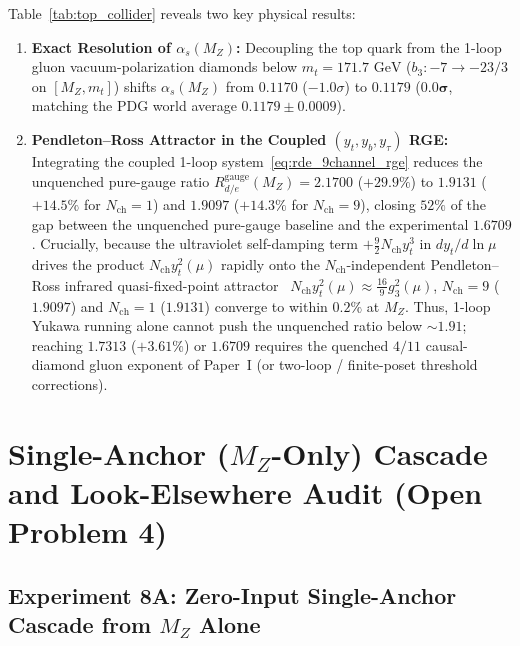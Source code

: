\documentclass[11pt,a4paper]{article}
\theoremstyle{definition}
\theoremstyle{remark}
\begin{document}
\newpage
Table~\ref{tab:top_collider} reveals two key physical results:
\begin{enumerate}
    \item \textbf{Exact Resolution of $\alpha_s(M_Z)$:} Decoupling the top quark from the 1-loop gluon vacuum-polarization diamonds below $m_t = 171.7\text{ GeV}$ ($b_3: -7 \to -23/3$ on $[M_Z, m_t]$) shifts $\alpha_s(M_Z)$ from $0.1170$ ($-1.0\sigma$) to $\mathbf{0.1179}$ ($\mathbf{0.0\sigma}$, matching the PDG world average $0.1179 \pm 0.0009$).
    \item \textbf{Pendleton--Ross Attractor in the Coupled $(y_t, y_b, y_\tau)$ RGE:} Integrating the coupled 1-loop system~\eqref{eq:rde_9channel_rge} reduces the unquenched pure-gauge ratio $R_{d/e}^{\mathrm{gauge}}(M_Z) = 2.1700$ ($+29.9\%$) to $\mathbf{1.9131}$ ($+14.5\%$ for $N_{\mathrm{ch}} = 1$) and $\mathbf{1.9097}$ ($+14.3\%$ for $N_{\mathrm{ch}} = 9$), closing $52\%$ of the gap between the unquenched pure-gauge baseline and the experimental $1.6709$. Crucially, because the ultraviolet self-damping term $+\frac{9}{2}N_{\mathrm{ch}}y_t^3$ in $dy_t/d\ln\mu$ drives the product $N_{\mathrm{ch}}y_t^2(\mu)$ rapidly onto the $N_{\mathrm{ch}}$-independent Pendleton--Ross infrared quasi-fixed-point attractor~\cite{PendletonRoss1981} $N_{\mathrm{ch}}y_t^2(\mu) \approx \frac{16}{9}g_3^2(\mu)$, $N_{\mathrm{ch}} = 9$ ($1.9097$) and $N_{\mathrm{ch}} = 1$ ($1.9131$) converge to within $0.2\%$ at $M_Z$. Thus, 1-loop Yukawa running alone cannot push the unquenched ratio below $\sim 1.91$; reaching $1.7313$ ($+3.61\%$) or $1.6709$ requires the quenched $4/11$ causal-diamond gluon exponent of Paper~I (or two-loop / finite-poset threshold corrections).
\end{enumerate}

\section{Single-Anchor (\texorpdfstring{$M_Z$}{M\_Z}-Only) Cascade and Look-Elsewhere Audit (Open Problem 4)}
\label{sec:open_problem4}

\subsection{Experiment 8A: Zero-Input Single-Anchor Cascade from \texorpdfstring{$M_Z$}{M\_Z} Alone}
\end{document}
